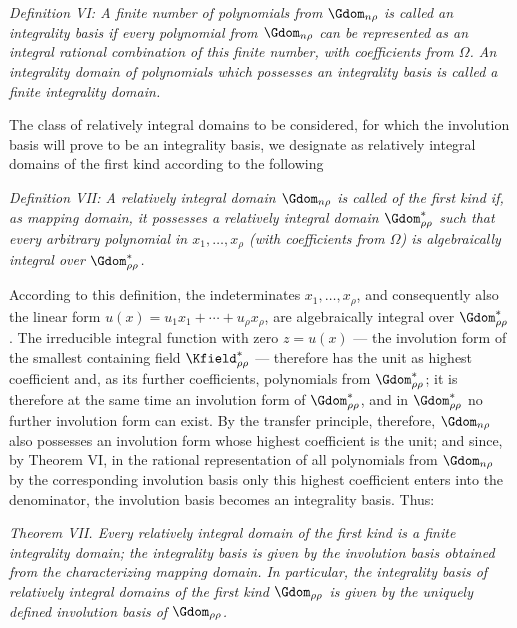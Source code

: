 \documentclass[11pt]{article}
\begin{document}
\emph{Definition VI: A finite number of polynomials from $\Gdom_{n\rho}$ is called an integrality basis if every polynomial from $\Gdom_{n\rho}$ can be represented as an integral rational combination of this finite number, with coefficients from $\Omega$. An integrality domain of polynomials which possesses an integrality basis is called a finite integrality domain.}

The class of relatively integral domains to be considered, for which the involution basis will prove to be an integrality basis, we designate as relatively integral domains of the first kind according to the following

\emph{Definition VII: A relatively integral domain $\Gdom_{n\rho}$ is called of the first kind if, as mapping domain, it possesses a relatively integral domain $\Gdom^*_{\rho\rho}$ such that every arbitrary polynomial in $x_1,
\ldots,x_\rho$ (with coefficients from $\Omega$) is algebraically integral over $\Gdom^*_{\rho\rho}$.}

According to this definition, the indeterminates $x_1,
\ldots,x_\rho$, and consequently also the linear form $u(x)=u_1x_1+\cdots+u_\rho x_\rho$, are algebraically integral over $\Gdom^*_{\rho\rho}$. The irreducible integral function with zero $z=u(x)$ --- the involution form of the smallest containing field $\Kfield^*_{\rho\rho}$ --- therefore has the unit as highest coefficient and, as its further coefficients, polynomials from $\Gdom^*_{\rho\rho}$; it is therefore at the same time an involution form of $\Gdom^*_{\rho\rho}$, and in $\Gdom^*_{\rho\rho}$ no further involution form can exist. By the transfer principle, therefore, $\Gdom_{n\rho}$ also possesses an involution form whose highest coefficient is the unit; and since, by Theorem VI, in the rational representation of all polynomials from $\Gdom_{n\rho}$ by the corresponding involution basis only this highest coefficient enters into the denominator, the involution basis becomes an integrality basis. Thus:

\emph{Theorem VII. Every relatively integral domain of the first kind is a finite integrality domain; the integrality basis is given by the involution basis obtained from the characterizing mapping domain. In particular, the integrality basis of relatively integral domains of the first kind $\Gdom_{\rho\rho}$ is given by the uniquely defined involution basis of $\Gdom_{\rho\rho}$.}
\end{document}
